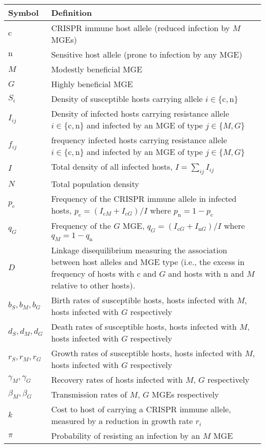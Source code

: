 \documentclass{article}
\newcommand{\badFGE}{M}
\newcommand{\goodFGE}{G}
\newcommand{\sensitive}{\mathrm{n}}
\newcommand{\immune}{\mathrm{c}}
\begin{document}
\begin{table}
    \begin{center}
        \begin{tabular}{p{2cm}p{10cm}}
\hline 
Symbol & Definition\tabularnewline
\hline 
    $\immune$ & CRISPR immune host allele (reduced infection by $\badFGE$ MGEs) \tabularnewline
    $\sensitive$ & Sensitive host allele (prone to infection by any MGE) \tabularnewline
    $\badFGE$ & Modestly beneficial MGE \tabularnewline
    $\goodFGE$ & Highly beneficial MGE \tabularnewline
    $S_{i}$ & Density of susceptible hosts carrying allele $i \in \{\immune,\sensitive\}$ \tabularnewline
    $I_{ij}$ & Density of infected hosts carrying resistance allele $i \in \{\immune,\sensitive\}$ and infected by an MGE of type $j \in \{\badFGE,\goodFGE\}$  \tabularnewline 
    $f_{ij}$ & frequency infected hosts carrying resistance allele $i \in \{\immune,\sensitive\}$ and infected by an MGE of type $j \in \{\badFGE,\goodFGE\}$  \tabularnewline 
    $I$ & Total density of all infected hosts, $I = \sum_{ij} I_{ij}$   \tabularnewline 
    $N$ & Total population density \tabularnewline 
            $p_{\immune}$ & Frequency of the CRISPR immune allele in infected hosts, $p_{\immune} = (I_{\immune \badFGE} + I_{\immune \goodFGE})/I$ where $p_{\sensitive} = 1-p_{\immune}$ \tabularnewline
            $q_{\goodFGE}$ & Frequency of the $\goodFGE$ MGE, $q_{\goodFGE} = (I_{\immune \goodFGE} + I_{\sensitive \goodFGE})/I$ where $q_{\badFGE} = 1 - q_{\sensitive}$ \tabularnewline
            $D$ & Linkage disequilibrium measuring the association between host alleles and MGE type (i.e., the excess in frequency of hosts with $\immune$ and $\goodFGE$ and hosts with $\sensitive$ and $\badFGE$ relative to other hosts). \tabularnewline
            $b_{S}, b_{\badFGE}, b_{\goodFGE}$ & Birth rates of susceptible hosts, hosts infected with $\badFGE$, hosts infected with $\goodFGE$ respectively \tabularnewline
            $d_{S}, d_{\badFGE}, d_{\goodFGE}$ & Death rates of susceptible hosts, hosts infected with $\badFGE$, hosts infected with $\goodFGE$ respectively \tabularnewline
            $r_{S}, r_{\badFGE}, r_{\goodFGE}$ & Growth rates of susceptible hosts, hosts infected with $\badFGE$, hosts infected with $\goodFGE$ respectively \tabularnewline 
            $\gamma_{\badFGE}, \gamma_{\goodFGE}$ & Recovery rates of hosts infected with $\badFGE$, $\goodFGE$ respectively \tabularnewline
            $\beta_{\badFGE}, \beta_{\goodFGE}$ & Transmission rates of $\badFGE$, $\goodFGE$ MGEs respectively \tabularnewline
            $k$ & Cost to host of carrying a CRISPR immune allele, measured by a reduction in growth rate $r_{i}$ \tabularnewline
            $\pi$ & Probability of resisting an infection by an $\badFGE$ MGE \tabularnewline
            \hline 
\end{tabular}
\caption{\label{tab:notation}}
    \end{center}
\end{table}
\end{document}
